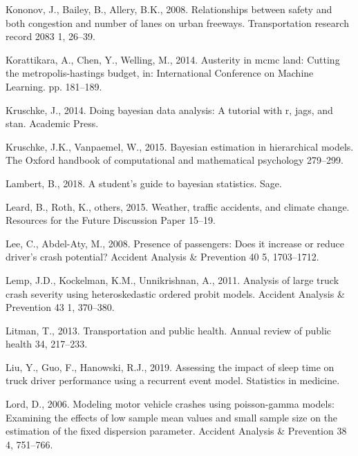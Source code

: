 \documentclass[12pt]{book}
\numberwithin{equation}{chapter}
\begin{document}
\leavevmode\hypertarget{ref-kononov2008relationships}{}%
Kononov, J., Bailey, B., Allery, B.K., 2008. Relationships between safety and both congestion and number of lanes on urban freeways. Transportation research record 2083 1, 26--39.

\leavevmode\hypertarget{ref-korattikara2014austerity}{}%
Korattikara, A., Chen, Y., Welling, M., 2014. Austerity in mcmc land: Cutting the metropolis-hastings budget, in: International Conference on Machine Learning. pp. 181--189.

\leavevmode\hypertarget{ref-kruschke2014doing}{}%
Kruschke, J., 2014. Doing bayesian data analysis: A tutorial with r, jags, and stan. Academic Press.

\leavevmode\hypertarget{ref-kruschke2015bayesian}{}%
Kruschke, J.K., Vanpaemel, W., 2015. Bayesian estimation in hierarchical models. The Oxford handbook of computational and mathematical psychology 279--299.

\leavevmode\hypertarget{ref-lambert2018student}{}%
Lambert, B., 2018. A student's guide to bayesian statistics. Sage.

\leavevmode\hypertarget{ref-leard2015weather}{}%
Leard, B., Roth, K., others, 2015. Weather, traffic accidents, and climate change. Resources for the Future Discussion Paper 15--19.

\leavevmode\hypertarget{ref-lee2008presence}{}%
Lee, C., Abdel-Aty, M., 2008. Presence of passengers: Does it increase or reduce driver's crash potential? Accident Analysis \& Prevention 40 5, 1703--1712.

\leavevmode\hypertarget{ref-lemp2011analysis}{}%
Lemp, J.D., Kockelman, K.M., Unnikrishnan, A., 2011. Analysis of large truck crash severity using heteroskedastic ordered probit models. Accident Analysis \& Prevention 43 1, 370--380.

\leavevmode\hypertarget{ref-litman2013transportation}{}%
Litman, T., 2013. Transportation and public health. Annual review of public health 34, 217--233.

\leavevmode\hypertarget{ref-liu2019assessing}{}%
Liu, Y., Guo, F., Hanowski, R.J., 2019. Assessing the impact of sleep time on truck driver performance using a recurrent event model. Statistics in medicine.

\leavevmode\hypertarget{ref-lord2006modeling}{}%
Lord, D., 2006. Modeling motor vehicle crashes using poisson-gamma models: Examining the effects of low sample mean values and small sample size on the estimation of the fixed dispersion parameter. Accident Analysis \& Prevention 38 4, 751--766.
\end{document}
